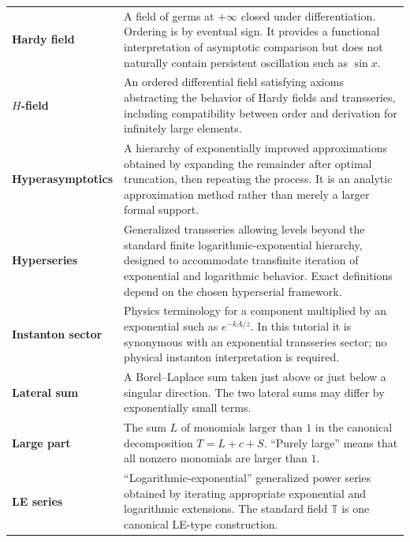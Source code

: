 \documentclass[11pt,openany]{book}
\theoremstyle{definition}
\theoremstyle{plain}
\theoremstyle{remark}
\newcommand{\T}{\mathbb{T}}
\begin{document}
\begin{longtable}{@{}p{}p{}@{}}
\textbf{Hardy field}\index{Hardy field}
& A field of germs at $+\infty$ closed under differentiation. Ordering is by
eventual sign. It provides a functional interpretation of asymptotic
comparison but does not naturally contain persistent oscillation such as
$\sin x$.\\

\textbf{$H$-field}\index{H-field@$H$-field}
& An ordered differential field satisfying axioms abstracting the behavior of
Hardy fields and transseries, including compatibility between order and
derivation for infinitely large elements.\\

\textbf{Hyperasymptotics}\index{hyperasymptotics}
& A hierarchy of exponentially improved approximations obtained by expanding
the remainder after optimal truncation, then repeating the process. It is an
analytic approximation method rather than merely a larger formal support.\\

\textbf{Hyperseries}\index{hyperseries}
& Generalized transseries allowing levels beyond the standard finite
logarithmic-exponential hierarchy, designed to accommodate transfinite
iteration of exponential and logarithmic behavior. Exact definitions depend
on the chosen hyperserial framework.\\

\textbf{Instanton sector}\index{instanton sector}
& Physics terminology for a component multiplied by an exponential such as
$e^{-kA/z}$. In this tutorial it is synonymous with an exponential
transseries sector; no physical instanton interpretation is required.\\

\textbf{Lateral sum}\index{lateral Borel sum}
& A Borel--Laplace sum taken just above or just below a singular direction.
The two lateral sums may differ by exponentially small terms.\\

\textbf{Large part}\index{large part}
& The sum $L$ of monomials larger than $1$ in the canonical decomposition
$T=L+c+S$. ``Purely large'' means that all nonzero monomials are larger than
$1$.\\

\textbf{LE series}\index{LE series}
& ``Logarithmic-exponential'' generalized power series obtained by iterating
appropriate exponential and logarithmic extensions. The standard field
$\T$ is one canonical LE-type construction.\\


\end{longtable}
\end{document}
